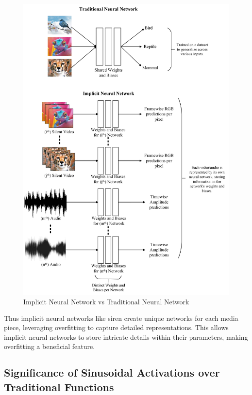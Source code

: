 \documentclass{ioereport}
\begin{document}
    \begin{figure}[H]
        \centering
        \includegraphics[width=0.95\linewidth]{assets/why overfitting.png}
        \caption{Implicit Neural Network vs Traditional Neural Network}
        \label{fig:implicit-vs-traditional}
    \end{figure}

    Thus implicit neural networks like \gls{siren} create unique networks for each media piece, leveraging overfitting to capture detailed representations. This allows implicit neural networks to store intricate details within their parameters, making overfitting a beneficial feature.
    
    
    \subsection{Significance of Sinusoidal Activations over Traditional Functions}
\end{document}

